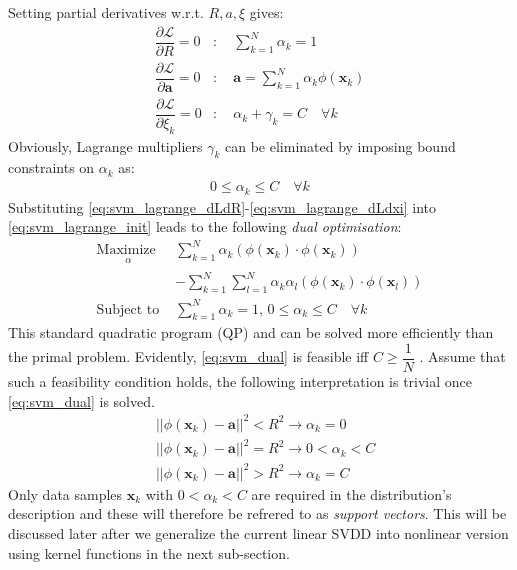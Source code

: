 \documentclass[conference]{IEEEtran}
\theoremstyle{problemstyle}
\begin{document}
Setting partial derivatives w.r.t. $R, a, \xi$ gives:
\begin{subequations}
\begin{align}
\dfrac{\partial \mathcal{L}}{\partial R} = 0 &: \quad \sum_{k=1}^N \alpha_k = 1 \label{eq:svm_lagrange_dLdR} \\
\dfrac{\partial \mathcal{L}}{\partial \mathbf{a}} = 0 &: \quad \mathbf{a} = \sum_{k=1}^N \alpha_k \phi \left( \mathbf{x}_k \right) \label{eq:svm_lagrange_dLda} \\
\dfrac{\partial \mathcal{L}}{\partial \xi_k} = 0 &: \quad \alpha_k + \gamma_k = C \quad \forall k \label{eq:svm_lagrange_dLdxi}
\end{align}
\end{subequations}
Obviously, Lagrange multipliers $\gamma_k$ can be eliminated by imposing bound constraints on $\alpha_k$ as:
\begin{align}
0\le \alpha_k \le C \quad \forall k
\end{align}
Substituting \eqref{eq:svm_lagrange_dLdR}-\eqref{eq:svm_lagrange_dLdxi} into \eqref{eq:svm_lagrange_init} leads to the following \emph{dual optimisation}:
\begin{subequations}\label{eq:svm_dual}
\begin{align}
\underset{
	\begin{array}{c}
		 \alpha
	\end{array}}{\text{Maximize }} &\sum_{k=1}^N \alpha_k \left( \phi \left( \mathbf{x}_k \right) \cdot \phi \left( \mathbf{x}_k \right) \right) \nonumber \\&- \sum_{k=1}^N \sum_{l=1}^N \alpha_k \alpha_l \left( \phi \left( \mathbf{x}_k \right) \cdot \phi \left( \mathbf{x}_l \right) \right) \\
\text{Subject to } &\sum_{k=1}^N \alpha_k = 1 \text{, } 0 \le \alpha_k \le C \quad \forall k
\end{align}
\end{subequations}
This standard quadratic program (QP) and can be solved more efficiently than the primal problem. Evidently, \eqref{eq:svm_dual} is feasible iff $C \ge \dfrac{1}{N}$ \cite{chang2013revisit}. Assume that such a feasibility condition holds, the following interpretation is trivial once \eqref{eq:svm_dual} is solved.
\begin{subequations}
\begin{align}
&\left|\left| \phi \left( \mathbf{x}_k \right) - \mathbf{a} \right|\right|^2 < R^2 \to \alpha_k = 0 \\
&\left|\left| \phi \left( \mathbf{x}_k \right) - \mathbf{a} \right|\right|^2 = R^2 \to 0 < \alpha_k < C \label{eq:sv_alpha}\\
&\left|\left| \phi \left( \mathbf{x}_k \right) - \mathbf{a} \right|\right|^2 > R^2 \to \alpha_k = C
\end{align}
\end{subequations}
Only data samples $\mathbf{x}_k$ with $0 < \alpha_k < C$ are required in the distribution's description and these will therefore be refrered to as \emph{support vectors}. This will be discussed later after we generalize the current linear SVDD into nonlinear version using kernel functions in the next sub-section. 
\end{document}

